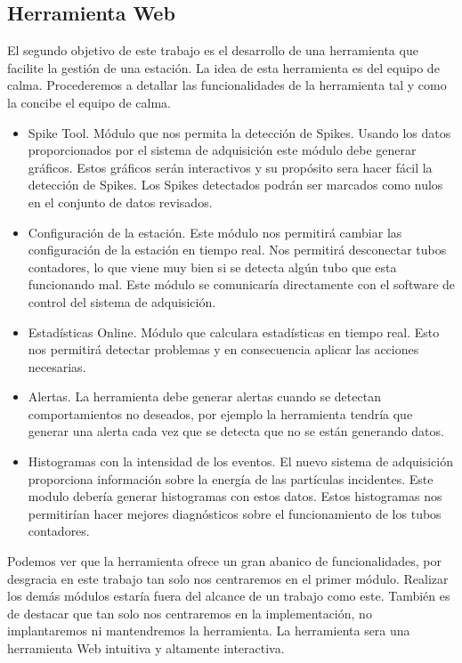 	\subsection{Herramienta Web}
		El segundo objetivo de este trabajo es el desarrollo de una herramienta que facilite la gestión de una estación. La idea de esta
		herramienta es del equipo de \gls{calma}. Procederemos a detallar las funcionalidades de la herramienta tal y como la concibe el equipo de
		\gls{calma}.
		\begin{itemize}
	         	\item	Spike Tool. Módulo que nos permita la detección de Spikes. Usando los datos proporcionados por el sistema de
			  	adquisición este módulo debe generar gráficos. Estos gráficos serán interactivos y su propósito sera hacer fácil la
				detección de Spikes. Los Spikes detectados podrán ser marcados como nulos en el conjunto de datos revisados. 
			\item 	Configuración de la estación. Este módulo nos permitirá cambiar las configuración de la estación en tiempo real. Nos
			  	permitirá desconectar tubos contadores, lo que viene muy bien si se detecta algún tubo que esta funcionando mal. Este
				módulo se comunicaría directamente con el software de control del sistema de adquisición. 
			\item 	Estadísticas Online. Módulo que calculara estadísticas en tiempo real. Esto nos permitirá detectar problemas y en
			  	consecuencia aplicar las acciones necesarias. 
			\item	Alertas. La herramienta debe generar alertas cuando se detectan comportamientos no deseados, por ejemplo la
			  	herramienta tendría que generar una alerta cada vez que se detecta que no se están generando datos.
			\item 	Histogramas con la intensidad de los eventos. El nuevo sistema de adquisición proporciona información sobre la energía
			  	de las partículas incidentes. Este modulo debería generar histogramas con estos datos. Estos histogramas nos
				permitirían hacer mejores diagnósticos sobre el funcionamiento de los tubos contadores. 
		\end{itemize}
		Podemos ver que la herramienta ofrece un gran abanico de funcionalidades, por desgracia en este trabajo tan solo nos centraremos en el
		primer módulo. Realizar los demás módulos estaría fuera del alcance de un trabajo como este. También es de destacar que tan solo
		nos centraremos en la implementación, no implantaremos ni mantendremos la herramienta. La herramienta sera una herramienta Web 
		intuitiva y altamente interactiva. 
		


